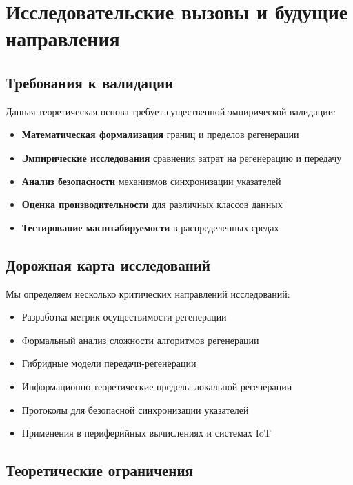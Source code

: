 \documentclass[11pt,a4paper]{article}
\begin{document}
\section{Исследовательские вызовы и будущие направления}

\subsection{Требования к валидации}

Данная теоретическая основа требует существенной эмпирической валидации:

\begin{itemize}
    \item \textbf{Математическая формализация} границ и пределов регенерации
    \item \textbf{Эмпирические исследования} сравнения затрат на регенерацию и передачу
    \item \textbf{Анализ безопасности} механизмов синхронизации указателей
    \item \textbf{Оценка производительности} для различных классов данных
    \item \textbf{Тестирование масштабируемости} в распределенных средах
\end{itemize}

\subsection{Дорожная карта исследований}

Мы определяем несколько критических направлений исследований:
\begin{itemize}
    \item Разработка метрик осуществимости регенерации
    \item Формальный анализ сложности алгоритмов регенерации
    \item Гибридные модели передачи-регенерации
    \item Информационно-теоретические пределы локальной регенерации
    \item Протоколы для безопасной синхронизации указателей
    \item Применения в периферийных вычислениях и системах IoT
\end{itemize}

\subsection{Теоретические ограничения}
\end{document}
